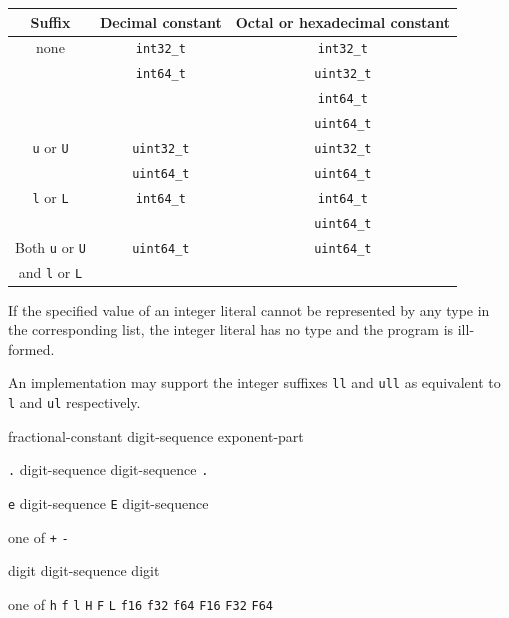 \begin{center}
  \begin{tabular}{|| c | c | c ||}
    \hline
    Suffix & Decimal constant & Octal or hexadecimal constant \\
    \hline
    \hline
    none & \texttt{int32\_t} & \texttt{int32\_t} \\
         & \texttt{int64\_t} & \texttt{uint32\_t} \\
         &         & \texttt{int64\_t} \\
         &         & \texttt{uint64\_t} \\
    \hline
    \texttt{u} or \texttt{U} & \texttt{uint32\_t} & \texttt{uint32\_t} \\
                             & \texttt{uint64\_t} & \texttt{uint64\_t} \\
    \hline
    \texttt{l} or \texttt{L} & \texttt{int64\_t} & \texttt{int64\_t} \\
                             &  & \texttt{uint64\_t} \\
    \hline
    Both \texttt{u} or \texttt{U} & \texttt{uint64\_t} & \texttt{uint64\_t} \\
    and \texttt{l} or \texttt{L}  &  &  \\
    \hline
  \end{tabular}
\end{center}

\p If the specified value of an integer literal cannot be represented by any
type in the corresponding list, the integer literal has no type and the program
is ill-formed.

\p An implementation may support the integer suffixes \texttt{ll} and
\texttt{ull} as equivalent to \texttt{l} and \texttt{ul} respectively.


\begin{grammar}
  \br
  fractional-constant  \br
  digit-sequence exponent-part 

  \br
   \texttt{.} digit-sequence\br
  digit-sequence \texttt{.}

  \br
  \texttt{e}  digit-sequence\br
  \texttt{E}  digit-sequence

   \textnormal{one of}\br
  \texttt{+} \texttt{-}

  \br
  digit\br
  digit-sequence digit

   \textnormal{one of}\br
  \texttt{h} \texttt{f} \texttt{l}\br
  \texttt{H} \texttt{F} \texttt{L}\br
  \texttt{f16} \texttt{f32} \texttt{f64}\br
  \texttt{F16} \texttt{F32} \texttt{F64}
\end{grammar}

